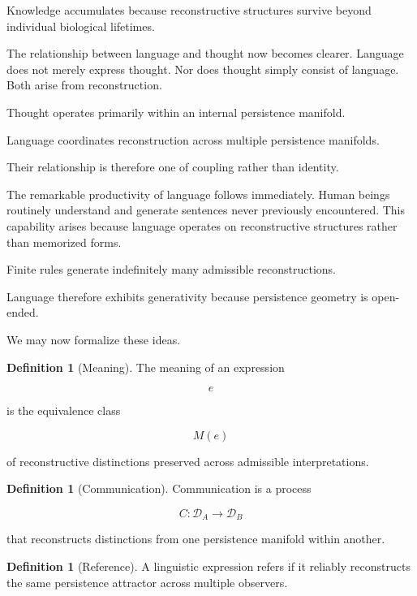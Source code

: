 \documentclass[12pt,oneside]{article}
\theoremstyle{definition}
\newtheorem{definition}[theorem]{Definition} \newtheorem{axiom}[theorem]{Axiom} \newtheorem{remark}[theorem]{Remark} \newtheorem{example}[theorem]{Example}
\begin{document}
Knowledge accumulates because reconstructive structures survive beyond individual biological lifetimes.

The relationship between language and thought now becomes clearer. Language does not merely express thought. Nor does thought simply consist of language. Both arise from reconstruction.

Thought operates primarily within an internal persistence manifold.

Language coordinates reconstruction across multiple persistence manifolds.

Their relationship is therefore one of coupling rather than identity.

The remarkable productivity of language follows immediately. Human beings routinely understand and generate sentences never previously encountered. This capability arises because language operates on reconstructive structures rather than memorized forms.

Finite rules generate indefinitely many admissible reconstructions.

Language therefore exhibits generativity because persistence geometry is open-ended.

We may now formalize these ideas.

\begin{definition}[Meaning]

The meaning of an expression

\[
e
\]

is the equivalence class

\[
M(e)
\]

of reconstructive distinctions preserved across admissible interpretations.

\end{definition}

\begin{definition}[Communication]

Communication is a process

\[
C :
\mathcal D_A
\rightarrow
\mathcal D_B
\]

that reconstructs distinctions from one persistence manifold within another.

\end{definition}

\begin{definition}[Reference]

A linguistic expression refers if it reliably reconstructs the same persistence attractor across multiple observers.

\end{definition}
\end{document}
